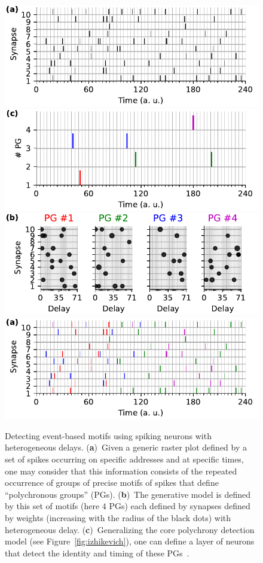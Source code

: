 \documentclass[brainsci, %
               review,accept,pdftex,moreauthors
               ]{Definitions/mdpi}
\begin{document}
\begin{figure}[H]%
  \includegraphics[width=0.490\linewidth]{figures/THC_1a_k.pdf}
  \includegraphics[width=0.490\linewidth]{figures/THC_1c.pdf}
  \includegraphics[width=0.490\linewidth]{figures/THC_1b.pdf}
  \includegraphics[width=0.490\linewidth]{figures/THC_1a.pdf}
    \caption{
      Detecting event-based motifs using spiking neurons with heterogeneous delays.
    { (\textbf{a})}~Given a generic raster plot defined by a set of spikes occurring on specific addresses and at specific times, one may consider that this information consists of the repeated occurrence of groups of precise motifs of spikes that define ``polychronous groups'' (PGs). 
    { (\textbf{b})}~The generative model is defined by this set of motifs (here $4$ PGs) each defined by  synapses defined by weights (increasing with the radius of the black dots) with heterogeneous delay. 
    { (\textbf{c})}~Generalizing the core polychrony detection model (see Figure~\ref{fig:izhikevich}), one can define a layer of neurons that detect the identity and timing of these PGs~\citep{grimaldi_learning_2022}. %
}
\end{figure}
\end{document}
